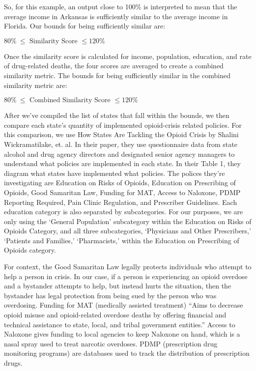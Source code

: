 \documentclass{article}
\begin{document}
So, for this example, an output close to 100\% is interpreted to mean
that the average income in Arkansas is sufficiently similar to the
average income in Florida. Our bounds for being sufficiently similar
are:

\(80\%\  \leq \text{\ Similarity\ Score\ } \leq 120\%\)

Once the similarity score is calculated for income, population,
education, and rate of drug-related deaths, the four scores are averaged
to create a combined similarity metric. The bounds for being
sufficiently similar in the combined similarity metric are:

\(80\%\  \leq \text{\ Combined\ Similarity\ Score\ } \leq 120\%\)

After we've compiled the list of states that fall within the bounds, we
then compare each state's quantity of implemented opioid-crisis related
policies. For this comparison, we use How States Are Tackling the Opioid
Crisis by Shalini Wickramatilake, et. al. In their paper, they use
questionnaire data from state alcohol and drug agency directors and
designated senior agency managers to understand what policies are
implemented in each state. In their Table 1, they diagram what states
have implemented what policies. The polices they're investigating are
Education on Risks of Opioids, Education on Prescribing of Opioids, Good
Samaritan Law, Funding for MAT, Access to Naloxone, PDMP Reporting
Required, Pain Clinic Regulation, and Prescriber Guidelines. Each
education category is also separated by subcategories. For our purposes,
we are only using the `General Population' subcategory within the
Education on Risks of Opioids Category, and all three subcategories,
`Physicians and Other Prescribers,' `Patients and Families,'
`Pharmacists,' within the Education on Prescribing of Opioids category.

For context, the Good Samaritan Law legally protects individuals who
attempt to help a person in crisis. In our case, if a person is
experiencing an opioid overdose and a bystander attempts to help, but
instead hurts the situation, then the bystander has legal protection
from being sued by the person who was overdosing. Funding for MAT
(medically assisted treatment) ``Aims to decrease opioid misuse and
opioid-related overdose deaths by offering financial and technical
assistance to state, local, and tribal government entities.'' Access to
Naloxone gives funding to local agencies to keep Naloxone on hand, which
is a nasal spray used to treat narcotic overdoses. PDMP (prescription
drug monitoring programs) are databases used to track the distribution
of prescription drugs.
\end{document}
